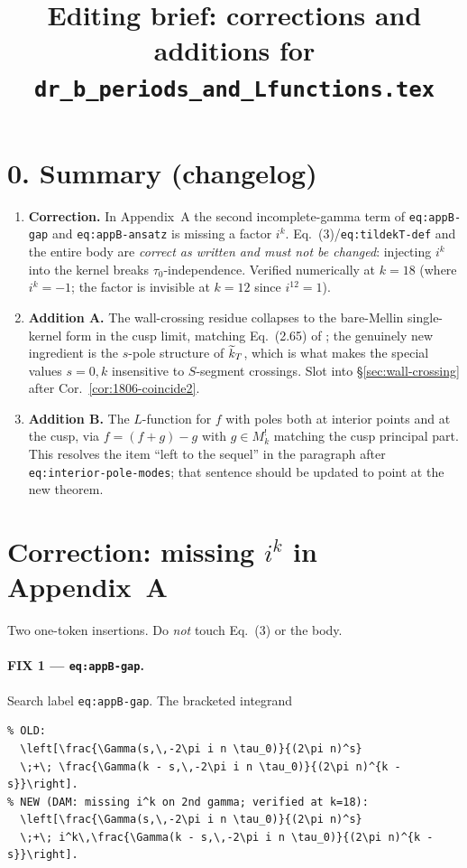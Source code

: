 \documentclass[11pt]{article}
\title{Editing brief: corrections and additions for\\
\texttt{dr\_b\_periods\_and\_Lfunctions.tex}}
\author{}\date{}
\begin{document}
\maketitle

\section*{0. Summary (changelog)}
\begin{enumerate}[label=\textbf{(\arabic*)}]
\item \textbf{Correction.} In Appendix~A the second incomplete-gamma
term of \texttt{eq:appB-gap} and \texttt{eq:appB-ansatz} is missing a
factor $i^k$. Eq.~(3)/\texttt{eq:tildekT-def} and the entire body are
\emph{correct as written and must not be changed}: injecting $i^k$ into
the kernel breaks $\tau_0$-independence. Verified numerically at $k=18$
(where $i^k=-1$; the factor is invisible at $k=12$ since $i^{12}=1$).
\item \textbf{Addition A.} The wall-crossing residue collapses to the
bare-Mellin single-kernel form in the cusp limit, matching
Eq.~(2.65) of \cite{1806}; the genuinely new ingredient is the
$s$-pole structure of $\widetilde{k}_T$, which is what makes the special values
$s=0,k$ insensitive to $S$-segment crossings. Slot into
\S\ref{sec:wall-crossing} after Cor.~\ref{cor:1806-coincide2}.
\item \textbf{Addition B.} The $L$-function for $f$ with poles both at
interior points and at the cusp, via $f=(f+g)-g$ with $g\in M_k^!$
matching the cusp principal part. This resolves the item ``left to the
sequel'' in the paragraph after \texttt{eq:interior-pole-modes}; that
sentence should be updated to point at the new theorem.
\end{enumerate}

\section{Correction: missing $i^k$ in Appendix~A}
Two one-token insertions. Do \emph{not} touch Eq.~(3) or the body.

\paragraph{FIX 1 --- \texttt{eq:appB-gap}.} Search label
\texttt{eq:appB-gap}. The bracketed integrand
\begin{verbatim}
% OLD:
  \left[\frac{\Gamma(s,\,-2\pi i n \tau_0)}{(2\pi n)^s}
  \;+\; \frac{\Gamma(k - s,\,-2\pi i n \tau_0)}{(2\pi n)^{k - s}}\right].
% NEW (DAM: missing i^k on 2nd gamma; verified at k=18):
  \left[\frac{\Gamma(s,\,-2\pi i n \tau_0)}{(2\pi n)^s}
  \;+\; i^k\,\frac{\Gamma(k - s,\,-2\pi i n \tau_0)}{(2\pi n)^{k - s}}\right].
\end{verbatim}
\end{document}
